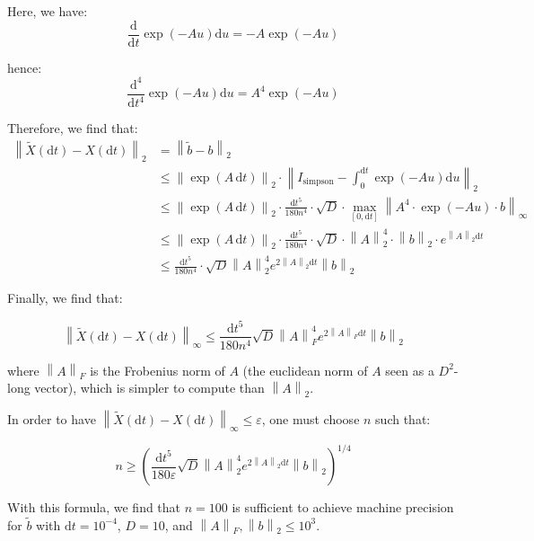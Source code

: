\documentclass[a4paper]{article}
\newcommand{\dt}{\mathrm{d}t}
\newcommand{\normeuc}[1]{\left\| #1 \right\|_2}
\newcommand{\normF}[1]{\left\| #1 \right\|_F}
\newcommand{\norminf}[1]{\left\| #1 \right\|_\infty}
\newcommand{\eps}{\varepsilon}
\begin{document}
Here, we have:
\begin{equation}
\frac{\mathrm{d}}{\dt} \exp(-A u) \mathrm{d} u = -A \exp(-A u)
\end{equation}

\noindent hence:
\begin{equation}
\frac{\mathrm{d}^4}{\dt^4} \exp(-A u) \mathrm{d} u = A^4 \exp(-A u)
\end{equation}

Therefore, we find that:
\begin{align}
\normeuc{\widetilde X(\dt) - X(\dt)} &= \normeuc{\widetilde b-b}\\
&\leq \normeuc{\exp(A \, \dt)} \cdot \normeuc{I_{\textrm{simpson}} - \int_0^{\dt} \exp(-A u) \mathrm{d}u}\\
&\leq \normeuc{\exp(A \, \dt)} \cdot \frac{\dt^5}{180n^4} \cdot \sqrt{D} \cdot \max_{[0,\dt]} \norminf{A^4 \cdot \exp(-A u) \cdot b}\\
&\leq \normeuc{\exp(A \, \dt)} \cdot \frac{\dt^5}{180n^4} \cdot \sqrt{D} \cdot \normeuc{A}^4 \cdot \normeuc{b} \cdot e^{\normeuc{A}\dt}\\
&\leq \frac{\dt^5}{180n^4} \cdot \sqrt{D} \normeuc{A}^4 e^{2\normeuc{A}\dt} \normeuc{b}
\end{align}

Finally, we find that:

\begin{equation}
\norminf{\widetilde X(\dt) - X(\dt)} \leq \frac{\dt^5}{180n^4} \sqrt{D} \normF{A}^4 e^{2\normF{A}\dt} \normeuc{b}
\end{equation}

\noindent where $\normF{A}$ is the Frobenius norm of $A$ (the euclidean norm of $A$ seen as a $D^2$-long vector),
which is simpler to compute than $\normeuc{A}$.

In order to have $\norminf{\widetilde X(\dt) - X(\dt)} \leq \eps$, one must choose $n$ such that:

\begin{equation}
n \geq \left(\frac{\dt^5}{180 \eps} \sqrt{D} \normeuc{A}^4 e^{2\normeuc{A}\dt} \normeuc{b}\right)^{1/4}
\end{equation}

With this formula, we find that $n = 100$ is sufficient to achieve machine precision for $\widetilde b$ with
$\dt = 10^{-4}$, $D = 10$, and $\normF{A}, \normeuc{b} \leq 10^3$.
\end{document}
